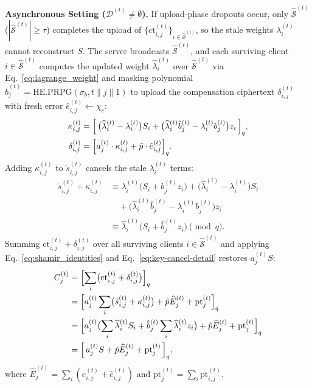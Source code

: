 \textbf{Asynchronous Setting ($\mathcal{D}^{(t)} \neq \emptyset$).} If upload-phase dropouts occur, only $\widehat{\mathcal{S}}^{(t)}$ ($|\widehat{\mathcal{S}}^{(t)}| \ge \tau$) completes the upload of $\{\mathrm{ct}_{i,j}^{(t)}\}_{i \in \widehat{\mathcal{S}}^{(t)}}$, so the stale weights $\lambda_i^{(t)}$ cannot reconstruct $S$. The server broadcasts $\widehat{\mathcal{S}}^{(t)}$, and each surviving client $i \in \widehat{\mathcal{S}}^{(t)}$ computes the updated weight $\widehat{\lambda}_i^{(t)}$ over $\widehat{\mathcal{S}}^{(t)}$ via Eq.~\eqref{eq:lagrange_weight} and masking polynomial $\hat{b}_j^{(t)} = \mathrm{HE.PRPG}(\sigma_b, t \parallel j \parallel 1)$ to upload the compensation ciphertext $\delta_{i,j}^{(t)}$ with fresh error $\hat{e}_{i,j}^{(t)} \leftarrow \chi_e$:
\begin{equation}
\begin{aligned}
\kappa_{i,j}^{(t)} &= \Bigl[\, \bigl(\widehat{\lambda}_i^{(t)} - \lambda_i^{(t)}\bigr) S_i + \bigl(\widehat{\lambda}_i^{(t)} \hat{b}_j^{(t)} - \lambda_i^{(t)} b_j^{(t)}\bigr) z_i \,\Bigr]_q, \\
\delta_{i,j}^{(t)} &= \Bigl[ a_j^{(t)} \cdot \kappa_{i,j}^{(t)} + \tilde{p} \cdot \hat{e}_{i,j}^{(t)} \Bigr]_q.
\end{aligned}
\label{eq:async-patch}
\end{equation}
Adding $\kappa_{i,j}^{(t)}$ to $\tilde{s}_{i,j}^{(t)}$ cancels the stale $\lambda_i^{(t)}$ terms:
\begin{equation}
\begin{aligned}
\tilde{s}_{i,j}^{(t)} + \kappa_{i,j}^{(t)}
&\equiv \lambda_i^{(t)}\bigl(S_i + b_j^{(t)} z_i\bigr) + \bigl(\widehat{\lambda}_i^{(t)} - \lambda_i^{(t)}\bigr) S_i \\[-2pt]
&\quad + \bigl(\widehat{\lambda}_i^{(t)} \hat{b}_j^{(t)} - \lambda_i^{(t)} b_j^{(t)}\bigr) z_i \\[-2pt]
&\equiv \widehat{\lambda}_i^{(t)}\bigl(S_i + \hat{b}_j^{(t)} z_i\bigr) \pmod q.
\end{aligned}
\label{eq:key-cancel-detail}
\end{equation}
Summing $\mathrm{ct}_{i,j}^{(t)} + \delta_{i,j}^{(t)}$ over all surviving clients $i \in \widehat{\mathcal{S}}^{(t)}$ and applying Eq.~\eqref{eq:shamir_identities} and Eq.~\eqref{eq:key-cancel-detail} restores $a_j^{(t)}S$:
\begin{align}
C_j^{(t)} &= \Bigl[ \sum_{i} \bigl( \mathrm{ct}_{i,j}^{(t)} + \delta_{i,j}^{(t)} \bigr) \Bigr]_q \notag \\
&= \Bigl[ a_j^{(t)} \sum_{i} \bigl(\tilde{s}_{i,j}^{(t)} + \kappa_{i,j}^{(t)}\bigr) + \tilde{p} \widehat{E}_j^{(t)} + \mathrm{pt}_j^{(t)} \Bigr]_q \notag \\
&= \Bigl[ a_j^{(t)} \bigl( \sum_{i} \widehat{\lambda}_i^{(t)} S_i + \hat{b}_j^{(t)} \sum_{i} \widehat{\lambda}_i^{(t)} z_i \bigr) + \tilde{p} \widehat{E}_j^{(t)} + \mathrm{pt}_j^{(t)} \Bigr]_q \notag \\
&= \Bigl[\, a_j^{(t)} S + \tilde{p} \widehat{E}_j^{(t)} + \mathrm{pt}_j^{(t)} \,\Bigr]_q,
\label{eq:async-agg}
\end{align}
where $\widehat{E}_j^{(t)} = \sum_{i} (e_{i,j}^{(t)} + \hat{e}_{i,j}^{(t)})$ and $\mathrm{pt}_j^{(t)} = \sum_{i} \mathrm{pt}_{i,j}^{(t)}$.


